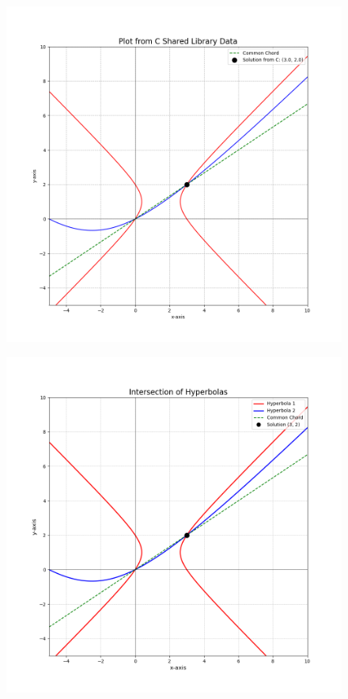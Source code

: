 \documentclass[journal]{IEEEtran}
\begin{document}
	\begin{figure}[H]
		\centering
		\includegraphics[width = 0.6\columnwidth]{figs/Figure_1.png}
		\caption*{}
		\label{fig1}
	\end{figure}
	\begin{figure}[H]
		\centering
		\includegraphics[width = 0.6\columnwidth]{figs/Figure_2.png}
		\caption*{}
		\label{fig2}
	\end{figure}
	
\end{document}
